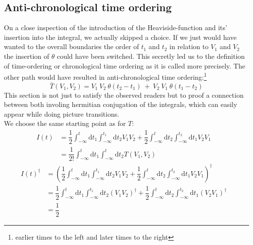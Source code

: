 \documentclass[12pt, titlepage]{article}
\begin{document}
\begin{appendices}
\section{Anti-chronological time ordering}
On a close inspection of the introduction of the Heaviside-function and its' insertion into the integral, we actually skipped a choice. If we just would have wanted to the overall boundaries the order of $ t_1 $ and $ t_2 $ in relation to $ V_1 $ and $ V_2 $ the insertion of $  \theta$  could have been switched. This secretly led us to the definition of time-ordering or chronological time ordering as it is called more precisely. The other path would have resulted in anti-chronological time ordering:\footnote{
earlier times to the left and later times to the right
}
\begin{equation}\label{anti_o}
 \bar{T}(V_1,V_2)
 =
 V_1\ V_2\ \theta (t_2 -t_1)\ +\ V_2\  V_1 \ \theta (t_1-t_2)
\end{equation} 
This section is not just to satisfy the observed readers but to proof a connection between both involing hermitian conjugation of the integrals, which can easily appear while doing picture transitions.
\\
We choose the same starting point as for $ T $:
\begin{align*}
  I(t)
  &= \dfrac{1}{2}
	 \int_{-\infty}^{t}\mathrm{d}t_1\int_{-\infty}^{t_1}\! \! \mathrm{d}t_2
	 V_1 V_2
	+
	\dfrac{1}{2}
	\int_{-\infty}^{t}\mathrm{d}t_2\int_{-\infty}^{t_2}\! \! \mathrm{d}t_1
	V_2 V_1
	 &\\
  &= \dfrac{1}{2!}
	 \int_{-\infty}^{t}\mathrm{d}t_1\int_{-\infty}^{t}\! \! \mathrm{d}t_2
	 T(V_1,V_2)
\end{align*}
\begin{subequations}
\begin{align}
  I(t)^{\dagger}
  &=\left(  \dfrac{1}{2}
	 \int_{-\infty}^{t}\mathrm{d}t_1\int_{-\infty}^{t_1}\! \! \mathrm{d}t_2
	 V_1 V_2
	+
	\dfrac{1}{2}
	\int_{-\infty}^{t}\mathrm{d}t_2\int_{-\infty}^{t_2}\! \! \mathrm{d}t_1
	V_2 V_1
	\right) ^{\dagger}
	 &\\
  &=  \dfrac{1}{2}
	 \int_{-\infty}^{t}\mathrm{d}t_1\int_{-\infty}^{t_1}\! \! \mathrm{d}t_2
	 \left(V_1 V_2\right) ^{\dagger}
	+
	\dfrac{1}{2}
	\int_{-\infty}^{t}\mathrm{d}t_2\int_{-\infty}^{t_2}\! \! \mathrm{d}t_1
	\left( V_2 V_1\right) ^{\dagger}
	&\\	
  &=  \dfrac{1}{2}

\end{align}
\end{subequations}
\end{appendices}
\end{document}
